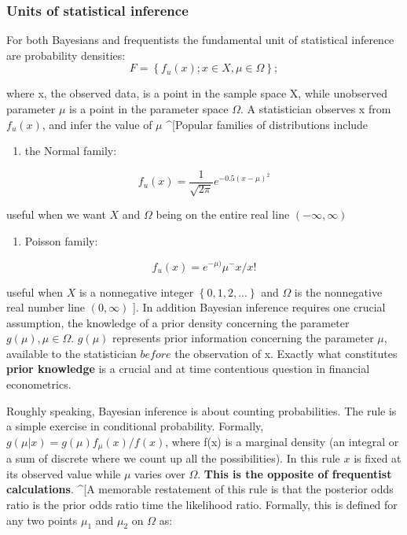 \documentclass{article}
\begin{document}
\hypertarget{units-of-statistical-inference}{%
\subsubsection{Units of statistical
inference}\label{units-of-statistical-inference}}

For both Bayesians and frequentists the fundamental unit of statistical
inference are probability densities:
\[F=\left\{f_u(x);x \in X,\mu \in \Omega \right\};\]

where x, the observed data, is a point in the sample space X, while
unobserved parameter \(\mu\) is a point in the parameter space
\(\Omega\). A statistician observes x from \(f_u(x)\), and infer the
value of \(\mu\) \^{}{[}Popular families of distributions include

\begin{enumerate}
\def\labelenumi{\arabic{enumi}.}
\tightlist
\item
  the Normal family:
\end{enumerate}

\[f_u(x)=\frac{1}{\sqrt{2 \pi}} e^{-0.5(x-\mu)^2}\]

useful when we want \(X\) and \(\Omega\) being on the entire real line
\((-\infty,\infty)\)

\begin{enumerate}
\def\labelenumi{\arabic{enumi}.}
\setcounter{enumi}{1}
\tightlist
\item
  Poisson family:
\end{enumerate}

\[f_u(x)=e^{-\mu)}\mu^-x/x!\]

useful when \(X\) is a nonnegative integer \(\left\{0,1,2,...\right\}\)
and \(\Omega\) is the nonnegative real number line \((0,\infty)\) {]}.
In addition Bayesian inference requires one crucial assumption, the
knowledge of a prior density concerning the parameter
\(g(\mu),\mu \in \Omega\). \(g(\mu)\) represents prior information
concerning the parameter \(\mu\), available to the statistician
\(before\) the observation of x. Exactly what constitutes \textbf{prior
knowledge} is a crucial and at time contentious question in financial
econometrics.

Roughly speaking, Bayesian inference is about counting probabilities.
The rule is a simple exercise in conditional probability. Formally,
\(g(\mu|x)=g(\mu)f_{\mu}(x)/f(x)\), where f(x) is a marginal density (an
integral or a sum of discrete where we count up all the possibilities).
In this rule \(x\) is fixed at its observed value while \(\mu\) varies
over \(\Omega\). \textbf{This is the opposite of frequentist
calculations}. \^{}{[}A memorable restatement of this rule is that the
posterior odds ratio is the prior odds ratio time the likelihood ratio.
Formally, this is defined for any two points \(\mu_1\) and \(\mu_2\) on
\(\Omega\) as:
\end{document}
